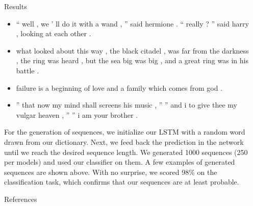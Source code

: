 \documentclass[final]{beamer}
\newcommand{\compresslist}{
  \setlength{\itemsep}{1pt}
  \setlength{\parskip}{0pt}
  \setlength{\parsep}{0pt}}
\newlength{\sepwidth}
\newlength{\colwidth}
\newcommand{\separatorcolumn}{\begin{column}{\sepwidth}\end{column}}
\begin{document}
\begin{frame}[t]
\begin{columns}[t]
\begin{column}{\colwidth}
\begin{block}{Results}
\begin{itemize}\compresslist
    \item `` well , we ' ll do it with a wand , '' said hermione . `` really ?
      '' said harry , looking at each other .
    \item  what looked about this
      way , the black citadel , was far from the
          darkness , the ring was heard , but the sea big was big , and a great
          ring was in his battle .
    \item failure is a beginning of love and a family which comes from god .
    \item  '' that now my mind shall screens his music , '' '' and i to give
      thee my vulgar heaven , '' '' i am your brother .
\end{itemize}
For the generation of sequences, we initialize our LSTM with a random word
drawn from our dictionary. Next, we feed back the prediction in the network
until we reach the desired sequence length. We generated 1000 sequences (250
per models) and used our classifier on them. A few examples of generated
sequences are shown above. With no surprise, we scored 98\% on the
classification task, which confirms that our sequences are at least probable.
\end{block}
\begin{block}{References}
\printbibliography
\end{block}

\end{column}

\separatorcolumn
\end{columns}
\end{frame}
\end{document}
